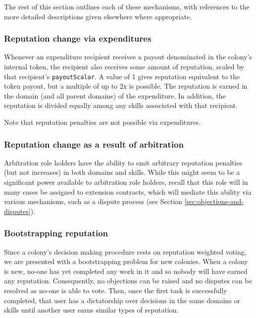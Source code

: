 The rest of this section outlines each of these mechanisms, with references to the more detailed descriptions given elsewhere where appropriate.

\subsubsection*{Reputation change via expenditures}

Whenever an expenditure recipient receives a payout denominated in the colony's internal token, the recipient also receives some amount of reputation, scaled by that recipient's \texttt{payoutScalar}. A value of 1 gives reputation equivalent to the token payout, but a multiple of up to 2x is possible. The reputation is earned in the domain (and all parent domains) of the expenditure. In addition, the reputation is divided equally among any skills associated with that recipient.

Note that reputation penalties are not possible via expenditures.

\subsubsection*{Reputation change as a result of arbitration}\label{sec:earning-rep-in-disputes}

Arbitration role holders have the ability to emit arbitrary reputation penalties (but not increases) in both domains and skills. While this might seem to be a significant power available to arbitration role holders, recall that this role will in many cases be assigned to extension contracts, which will mediate this ability via various mechanisms, such as a dispute process (see Section \ref{sec:objections-and-disputes}).

\subsubsection*{Bootstrapping reputation}\label{sec:bootstrapping-rep}

Since a colony's decision making procedure rests on reputation weighted voting, we are presented with a bootstrapping problem for new colonies. When a colony is new, no-one has yet completed any work in it and so nobody will have earned any reputation. Consequently, no objections can be raised and no disputes can be resolved as no-one is able to vote. Then, once the first task is successfully completed, that user has a dictatorship over decisions in the same domains or skills until another user earns similar types of reputation.

